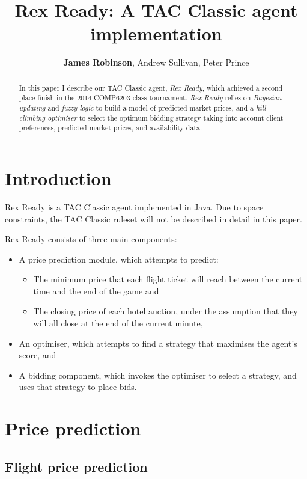 \documentclass[a4paper]{proc}
\title{Rex Ready: A TAC Classic agent implementation}
\author{\textbf{James Robinson}, Andrew Sullivan, Peter Prince}
\begin{document}
\maketitle

\begin{abstract}
  In this paper I describe our TAC Classic agent, \emph{Rex Ready}, which achieved a second place finish in the 2014 COMP6203 class tournament. \emph{Rex Ready} relies on \emph{Bayesian updating} and \emph{fuzzy logic} to build a model of predicted market prices, and a \emph{hill-climbing optimiser} to select the optimum bidding strategy taking into account client preferences, predicted market prices, and availability data.
\end{abstract}

\section{Introduction}

Rex Ready is a TAC Classic agent implemented in Java. Due to space constraints, the TAC Classic ruleset will not be described in detail in this paper.

Rex Ready consists of three main components:

\begin{itemize}
  \item A price prediction module, which attempts to predict:
  \begin{itemize}
    \item The minimum price that each flight ticket will reach between the current time and the end of the game and
    \item The closing price of each hotel auction, under the assumption that they will all close at the end of the current minute,
  \end{itemize}
  \item An optimiser, which attempts to find a strategy that maximises the agent's score, and
  \item A bidding component, which invokes the optimiser to select a strategy, and uses that strategy to place bids.
\end{itemize}

\section{Price prediction}

\subsection{Flight price prediction}
\end{document}
